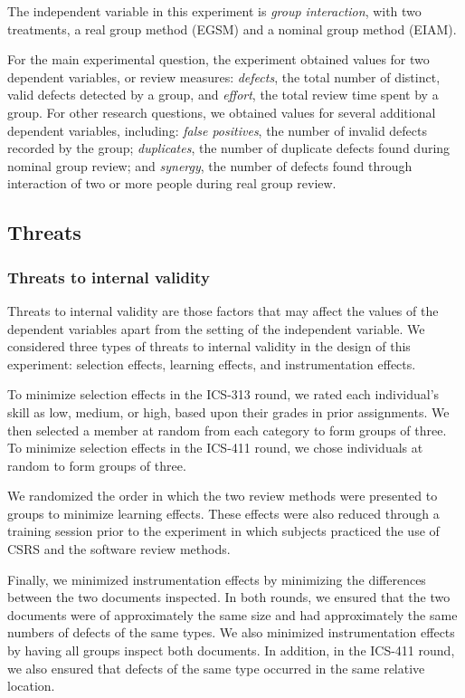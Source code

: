 The independent variable in this experiment is {\em group interaction},
with two treatments, a real group method (EGSM) and a nominal group method
(EIAM). 

For the main experimental question, the experiment obtained values for two
dependent variables, or review measures: {\em defects}, the total number of
distinct, valid defects detected by a group, and {\em effort}, the total
review time spent by a group.  For other research questions, we obtained
values for several additional dependent variables, including: {\em false
  positives}, the number of invalid defects recorded by the group; {\em
  duplicates}, the number of duplicate defects found during nominal group
review; and {\em synergy}, the number of defects found through interaction
of two or more people during real group review.

\subsection {Threats}

\subsubsection{Threats to internal validity}


Threats to internal validity are those factors that may affect the values
of the dependent variables apart from the setting of the independent
variable.  We considered three types of threats to internal validity
in the design of this experiment: selection effects, learning effects, 
and instrumentation effects. 

To minimize selection effects in the ICS-313 round, we rated each
individual's skill as low, medium, or high, based upon their grades in
prior assignments. We then selected a member at random from each category
to form groups of three. To minimize selection effects in the ICS-411
round, we chose individuals at random to form groups of three.

We randomized the order in which the two review methods were
presented to groups to minimize learning effects. These effects  were
also reduced through a training session prior to the experiment in which
subjects practiced the use of CSRS and the software review methods.

Finally, we minimized instrumentation effects by minimizing the differences
between the two documents inspected. In both rounds, we ensured that the
two documents were of approximately the same size and
had approximately the same numbers of defects of the same
types. We also minimized instrumentation effects by having all groups
inspect both documents.  In addition, in the ICS-411 round, we also ensured
that defects of the same type occurred in the same relative location.

